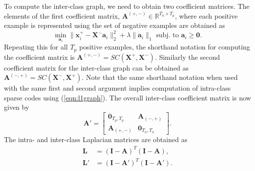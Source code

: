To compute the inter-class graph, we need to obtain two coefficient matrices. The elements of the first coefficient matrix, $\mathbf{A}^{(+,-)} \in \mathbb{R}^{T_n \times T_p}$, where each positive example is represented using the set of negative examples are obtained as
\begin{equation}
\min_{\mathbf{a}_i} \|\mathbf{x}_i^{+} - \mathbf{X}^{-} \mathbf{a}_i\|_2^2 + \lambda \|\mathbf{a}_i\|_1 \text{ subj. to } \mathbf{a}_i \geq \mathbf{0}.
\label{eqn:l1graph_inter}
\end{equation} Repeating this for all $T_p$ positive examples, the shorthand notation for computing the coefficient matrix is $\mathbf{A}^{(+,-)} = SC(\mathbf{X}^{+},\mathbf{X}^{-})$. Similarly the second coefficient matrix for the inter-class graph can be obtained as $\mathbf{A}^{(-,+)} = SC(\mathbf{X}^{-},\mathbf{X}^{+})$. Note that the same shorthand notation when used with the same first and second argument implies computation of intra-class sparse codes using (\ref{eqn:l1graph}). The overall inter-class coefficient matrix is now given by
\begin{equation}
\mathbf{A}' = 
\begin{bmatrix}
\mathbf{0}_{T_p,T_p} & \mathbf{A}_{(-,+)}  \\
\mathbf{A}_{(+,-)} &  \mathbf{0}_{T_n,T_n}
\end{bmatrix}.
\label{eqn:propbc}
\end{equation} The intra- and inter-class Laplacian matrices are obtained as
\begin{align}
\mathbf{L} &= (\mathbf{I} - \mathbf{A})^T (\mathbf{I} - \mathbf{A}), \\
\mathbf{L}' &= (\mathbf{I} - \mathbf{A}')^T (\mathbf{I} - \mathbf{A}').
\end{align}

